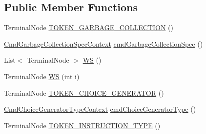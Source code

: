 \subsection*{Public Member Functions}
\begin{DoxyCompactItemize}
\item 
Terminal\+Node \hyperlink{classgov_1_1nasa_1_1jpf_1_1inspector_1_1server_1_1expression_1_1parser_1_1_expression_grammar_paee196826319d0ea00470866a7ffd8d7b_a94f3f8a8496e586d3332c9c780cdab60}{T\+O\+K\+E\+N\+\_\+\+G\+A\+R\+B\+A\+G\+E\+\_\+\+C\+O\+L\+L\+E\+C\+T\+I\+ON} ()
\item 
\hyperlink{classgov_1_1nasa_1_1jpf_1_1inspector_1_1server_1_1expression_1_1parser_1_1_expression_grammar_pa9b16c5c3aaa9986dba28b01bf7446bf9}{Cmd\+Garbage\+Collection\+Spec\+Context} \hyperlink{classgov_1_1nasa_1_1jpf_1_1inspector_1_1server_1_1expression_1_1parser_1_1_expression_grammar_paee196826319d0ea00470866a7ffd8d7b_a5cf00301562678621330f00d128d1a5f}{cmd\+Garbage\+Collection\+Spec} ()
\item 
List$<$ Terminal\+Node $>$ \hyperlink{classgov_1_1nasa_1_1jpf_1_1inspector_1_1server_1_1expression_1_1parser_1_1_expression_grammar_paee196826319d0ea00470866a7ffd8d7b_a26ed65326f1e7e1d90d629fcacf821b0}{WS} ()
\item 
Terminal\+Node \hyperlink{classgov_1_1nasa_1_1jpf_1_1inspector_1_1server_1_1expression_1_1parser_1_1_expression_grammar_paee196826319d0ea00470866a7ffd8d7b_a581dec9117fdbf367720b92a7e02e0da}{WS} (int i)
\item 
Terminal\+Node \hyperlink{classgov_1_1nasa_1_1jpf_1_1inspector_1_1server_1_1expression_1_1parser_1_1_expression_grammar_paee196826319d0ea00470866a7ffd8d7b_a466e48f7f4f9c0823f260853f8176c53}{T\+O\+K\+E\+N\+\_\+\+C\+H\+O\+I\+C\+E\+\_\+\+G\+E\+N\+E\+R\+A\+T\+OR} ()
\item 
\hyperlink{classgov_1_1nasa_1_1jpf_1_1inspector_1_1server_1_1expression_1_1parser_1_1_expression_grammar_pa25195f4046c6a14884faf2c870f5b76d}{Cmd\+Choice\+Generator\+Type\+Context} \hyperlink{classgov_1_1nasa_1_1jpf_1_1inspector_1_1server_1_1expression_1_1parser_1_1_expression_grammar_paee196826319d0ea00470866a7ffd8d7b_a82ec10f0eb1d55a9cb2d5c60095ff7bc}{cmd\+Choice\+Generator\+Type} ()
\item 
Terminal\+Node \hyperlink{classgov_1_1nasa_1_1jpf_1_1inspector_1_1server_1_1expression_1_1parser_1_1_expression_grammar_paee196826319d0ea00470866a7ffd8d7b_a56a1d2bdfe6437401b3aa7be2ed6b63c}{T\+O\+K\+E\+N\+\_\+\+I\+N\+S\+T\+R\+U\+C\+T\+I\+O\+N\+\_\+\+T\+Y\+PE} ()
\item 

\end{DoxyCompactItemize}
